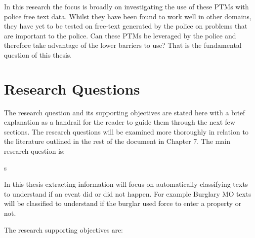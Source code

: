 In this research the focus is broadly on investigating the use of these PTMs with police free text data. Whilst they have been found to work well in other domains, they have yet to be tested on free-text generated by the police on problems that are important to the police. Can these PTMs be leveraged by the police and therefore take advantage of the lower barriers to use? That is the fundamental question of this thesis.



\section{Research Questions}

The research question and its supporting objectives are stated here with a brief explanation as a handrail for the reader to guide them through the next few sections. The research questions will be examined more thoroughly in relation to the literature outlined in the rest of the document in Chapter 7. The main research question is:

s

In this thesis extracting information will focus on automatically classifying texts to understand if an event did or did not happen. For example Burglary MO texts will be classified to understand if the burglar used force to enter a property or not.

The research supporting objectives are:

